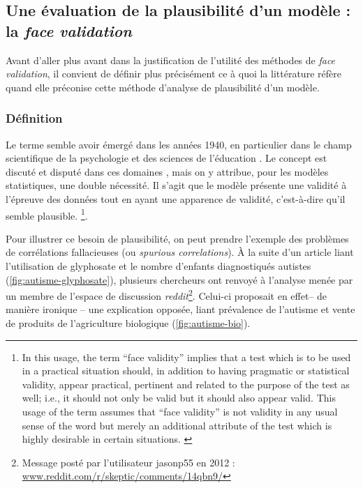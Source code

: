\subsection{Une évaluation de la plausibilité d'un modèle : la \og \textit{face validation}\fg{}}\label{subsec:face-validity}

Avant d'aller plus avant dans la justification de l'utilité des méthodes de \textit{face validation}, il convient de définir plus précisément ce à quoi la littérature réfère quand elle préconise cette méthode d'analyse de plausibilité d'un modèle.

\subsubsection{Définition}
Le terme semble avoir émergé dans les années 1940, en particulier dans le champ scientifique de la psychologie et des sciences de l'éducation \autocite{nevo_face_1985}.
Le concept est discuté et disputé dans ces domaines \autocite{mosier_critical_1947}, mais on y attribue, pour les modèles statistiques, une double nécessité.
Il s'agit que le modèle présente une validité à l'épreuve des données tout en ayant une apparence de validité, c'est-à-dire qu'il semble plausible.
\footnote{
	\og
	In this usage, the term ``face validity'' implies that a test which is to be used in a practical situation should, in addition to having pragmatic or statistical validity, appear practical, pertinent and related to the purpose of the test as well; i.e., it should not only be valid but it should also appear valid.
	This usage of the term assumes that ``face validity'' is not validity in any usual sense of the word but merely an additional attribute of the test which is highly desirable in certain situations.
	\fg{} \textcite[192]{mosier_critical_1947}
}.

Pour illustrer ce besoin de \og plausibilité\fg{}, on peut prendre l'exemple des problèmes de corrélations fallacieuses (ou \og \textit{spurious correlations}\fg{}).
À la suite d'un article \autocite{shaw_elevated_2017} liant l'utilisation de glyphosate et le nombre d'enfants diagnostiqués autistes (\cref{fig:autisme-glyphosate}), plusieurs chercheurs ont renvoyé à l'analyse menée par un membre de l'espace de discussion \textit{reddit}\footnote{
	Message posté par l'utilisateur \og jasonp55\fg{} en 2012 : \\ \href{https://web.archive.org/web/20130105045416/https://www.reddit.com/r/skeptic/comments/14qbn9/rskeptic_i_was_practicing_graphpad_and_i_think_i/}{www.reddit.com/r/skeptic/comments/14qbn9/}
}.
Celui-ci proposait en effet-- de manière ironique -- une explication opposée, liant prévalence de l'autisme et vente de produits de l'agriculture biologique (\cref{fig:autisme-bio}).

